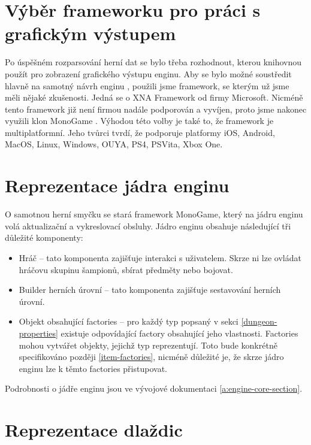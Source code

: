 
\section{Výběr frameworku pro práci s grafickým výstupem}

Po úspěšném rozparsování herní dat se bylo třeba rozhodnout, kterou knihovnou použít pro zobrazení grafického výstupu enginu. 
Aby se bylo možné soustředit hlavně na samotný návrh enginu , použili jsme framework, se kterým už jsme měli nějaké zkušenosti.
Jedná se o XNA Framework od firmy Microsoft. Nicméně tento framework již není firmou nadále podporován a vyvíjen, proto jsme nakonec využili 
klon MonoGame \cite{MonoGame}. Výhodou této volby je také to, že framework je multiplatformní. Jeho tvůrci tvrdí, že podporuje platformy
iOS, Android, MacOS, Linux, Windows, OUYA, PS4, PSVita, Xbox One.

\section{Reprezentace jádra enginu}\label{a:engine-core-section}

O samotnou herní smyčku se stará framework MonoGame, který na jádru enginu volá aktualizační a vykreslovací obsluhy.
Jádro enginu obsahuje následující tři důležité komponenty:
\begin{itemize}
\item Hráč -- tato komponenta zajišťuje interakci s uživatelem. Skrze ni lze ovládat hráčovu skupinu šampionů, sbírat předměty nebo bojovat.
\item Builder herních úrovní -- tato komponenta zajišťuje sestavování herních úrovní.
\item Objekt obsahující factories -- pro každý typ popsaný v sekci \ref{dungeon-properties} existuje odpovídající
	factory obsahující jeho vlastnosti. Factories mohou vytvářet objekty, jejichž typ reprezentují. Toto bude konkrétně
	specifikováno později \vref{item-factories}, nicméně důležité je, že skrze jádro enginu lze k těmto factories přistupovat.
\end{itemize}
Podrobnosti o jádře enginu jsou ve vývojové dokumentaci \vref{a:engine-core-section}.

\section{Reprezentace dlaždic}\label{tile-representation}

